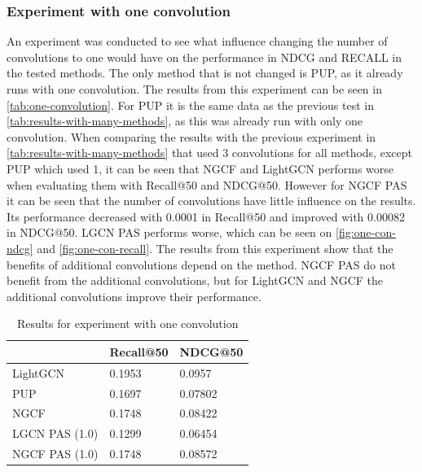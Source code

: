 \subsubsection{Experiment with one convolution}\label{sec:experiment-one-convolution}
An experiment was conducted to see what influence changing the number of convolutions to one would have on the performance in NDCG and RECALL in the tested methods.
The only method that is not changed is PUP, as it already runs with one convolution.
The results from this experiment can be seen in \autoref{tab:one-convolution}.
For PUP it is the same data as the previous test in \autoref{tab:results-with-many-methods}, as this was already run with only one convolution.
When comparing the results with the previous experiment in \autoref{tab:results-with-many-methods} that used 3 convolutions for all methods, except PUP which used 1, it can be seen that NGCF and LightGCN performs worse when evaluating them with Recall@50 and NDCG@50.
However for NGCF PAS it can be seen that the number of convolutions have little influence on the results.
Its performance decreased with 0.0001 in Recall@50 and improved with 0.00082 in NDCG@50.
LGCN PAS performs worse, which can be seen on \autoref{fig:one-con-ndcg} and \autoref{fig:one-con-recall}.
The results from this experiment show that the benefits of additional convolutions depend on the method.
NGCF PAS do not benefit from the additional convolutions, but for LightGCN and NGCF the additional convolutions improve their performance.
\begin{table}[]
    \centering
    \begin{tabular}{|l|l|l|}
        \hline
        \rowcolor[HTML]{FFFFFF}
                       & Recall@50 & NDCG@50 \\ \hline
        LightGCN       & 0.1953    & 0.0957  \\ \hline
        PUP            & 0.1697    & 0.07802 \\ \hline
        NGCF           & 0.1748    & 0.08422 \\ \hline
        LGCN PAS (1.0) & 0.1299    & 0.06454 \\ \hline
        NGCF PAS (1.0) & 0.1748    & 0.08572 \\ \hline
    \end{tabular}
    \caption{Results for experiment with one convolution}
    \label{tab:one-convolution}
\end{table}


